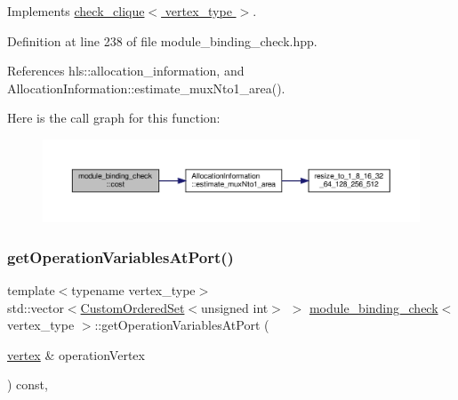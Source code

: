 Implements \hyperlink{structcheck__clique_a81f12b024d09699d522ed560c0a96ff6}{check\+\_\+clique$<$ vertex\+\_\+type $>$}.



Definition at line 238 of file module\+\_\+binding\+\_\+check.\+hpp.



References hls\+::allocation\+\_\+information, and Allocation\+Information\+::estimate\+\_\+mux\+Nto1\+\_\+area().

Here is the call graph for this function\+:
\nopagebreak
\begin{figure}[H]
\begin{center}
\leavevmode
\includegraphics[width=350pt]{d1/dc5/structmodule__binding__check_a7ab5b520f8ab3065e15a4726a61995b7_cgraph}
\end{center}
\end{figure}
\mbox{\label{structmodule__binding__check_a35fd352dca13ac8152dea12b3f4a9e09}} 
\subsubsection{\texorpdfstring{get\+Operation\+Variables\+At\+Port()}{getOperationVariablesAtPort()}}
{\footnotesize\ttfamily template$<$typename vertex\+\_\+type$>$ \\
std\+::vector$<$\hyperlink{classCustomOrderedSet}{Custom\+Ordered\+Set}$<$unsigned int$>$ $>$ \hyperlink{structmodule__binding__check}{module\+\_\+binding\+\_\+check}$<$ vertex\+\_\+type $>$\+::get\+Operation\+Variables\+At\+Port (\begin{DoxyParamCaption}\item[{\hyperlink{graph_8hpp_abefdcf0544e601805af44eca032cca14}{vertex} \&}]{operation\+Vertex }\end{DoxyParamCaption}) const\hspace{0.3cm}{\ttfamily [inline]}, {\ttfamily [private]}}



